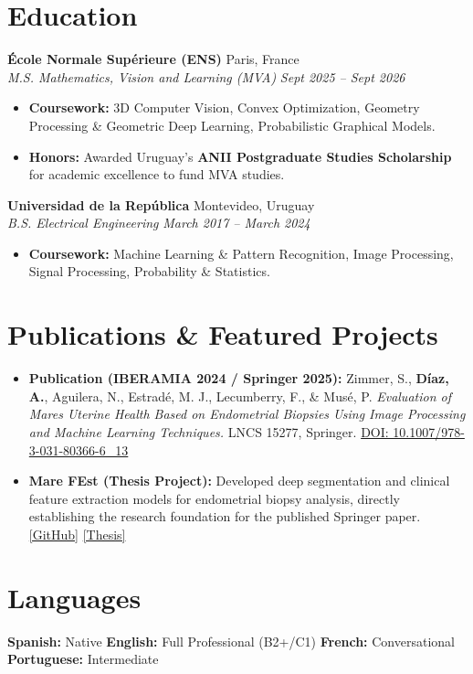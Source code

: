 \documentclass[10pt, a4paper]{article}
\newcommand{\entryheader}[4]{
    \noindent \textbf{#1} \hfill #2 \\
    \textit{#3} \hfill \textit{#4} \vspace{0pt}
}
\begin{document}
\section{Education}

\entryheader{École Normale Supérieure (ENS)}{Paris, France}{M.S. Mathematics, Vision and Learning (MVA)}{Sept 2025 -- Sept 2026}
\begin{itemize}
    \item \textbf{Coursework:} 3D Computer Vision, Convex Optimization, Geometry Processing \& Geometric Deep Learning, Probabilistic Graphical Models.
    \item \textbf{Honors:} Awarded Uruguay's \textbf{ANII Postgraduate Studies Scholarship} for academic excellence to fund MVA studies.
\end{itemize}
\vspace{3pt}

\entryheader{Universidad de la República}{Montevideo, Uruguay}{B.S. Electrical Engineering}{March 2017 -- March 2024}
\begin{itemize}
    \item \textbf{Coursework:} Machine Learning \& Pattern Recognition, Image Processing, Signal Processing, Probability \& Statistics.
\end{itemize}

\section{Publications \& Featured Projects}
\begin{itemize}
    \item \textbf{Publication (IBERAMIA 2024 / Springer 2025):} Zimmer, S., \textbf{Díaz, A.}, Aguilera, N., Estradé, M. J., Lecumberry, F., \& Musé, P. \textit{Evaluation of Mares Uterine Health Based on Endometrial Biopsies Using Image Processing and Machine Learning Techniques.} LNCS 15277, Springer. \href{https://doi.org/10.1007/978-3-031-80366-6_13}{DOI: 10.1007/978-3-031-80366-6\_13}
    \item \textbf{Mare FEst (Thesis Project):} Developed deep segmentation and clinical feature extraction models for endometrial biopsy analysis, directly establishing the research foundation for the published Springer paper. \href{https://github.com/Peregalli/MareFEst}{[GitHub]} \textbar{} \href{https://hdl.handle.net/20.500.12008/43668}{[Thesis]}
\end{itemize}

\section{Languages}
\textbf{Spanish:} Native \quad \textbar{} \quad \textbf{English:} Full Professional (B2+/C1) \quad \textbar{} \quad \textbf{French:} Conversational \quad \textbar{} \quad \textbf{Portuguese:} Intermediate
\end{document}
